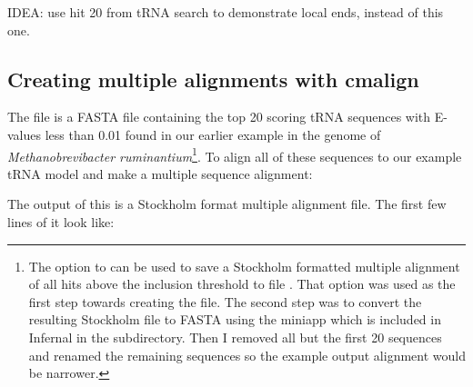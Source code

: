 IDEA: use hit 20 from tRNA search to demonstrate local ends, instead
of this one. 

\subsection{Creating multiple alignments with cmalign}

The file  is a FASTA file containing the
top 20 scoring tRNA sequences with E-values less than 0.01 found in our earlier
example  in the genome of \emph{Methanobrevibacter
ruminantium}\footnote{The  option to  can
be used to save a Stockholm formatted multiple alignment of all hits
above the inclusion threshold to file . That option was 
used as the first step towards creating the 
file. The second step was to convert the resulting Stockholm file to
FASTA using the  miniapp which is included in
Infernal in the  subdirectory. Then I removed
all but the first 20 sequences and renamed the remaining
sequences so the example output alignment would be narrower.}. To
align all of these sequences to our example tRNA model and make a
multiple sequence alignment: 


The output of this is a Stockholm format multiple alignment file. The
first few lines of it look like:

